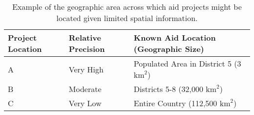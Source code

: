\newpage
\begin{table}[!htbp]
	\begin{tabular}{| l | l | l |}
	\hline
	Project Location & Relative Precision & Known Aid Location (Geographic Size)\\
    \hline
    A &  Very High & Populated Area in District 5 (3 $\text{km}^2$) \\ \hline
    B &  Moderate & Districts 5-8 (32,000 $\text{km}^2$) \\ \hline
    C &  Very Low & Entire Country (112,500 $\text{km}^2$) \\ \hline
	\end{tabular}
	\caption{Example of the geographic area across which aid projects might be located given limited spatial information.}\label{precision_example}
\end{table}

